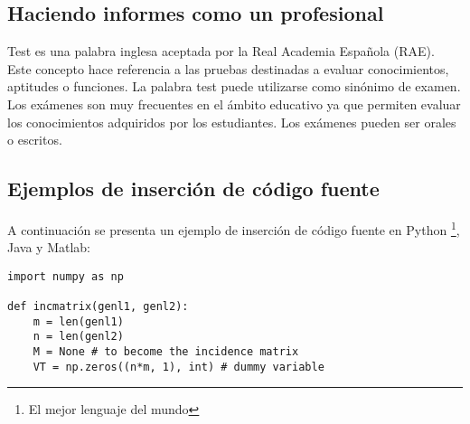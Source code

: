 	\subsection{Haciendo informes como un profesional}
		
		
		Test es una palabra inglesa aceptada por la Real Academia Española (RAE). Este concepto hace referencia a las pruebas destinadas a evaluar conocimientos, aptitudes o funciones. La palabra test puede utilizarse como sinónimo de examen. Los exámenes son muy frecuentes en el ámbito educativo ya que permiten evaluar los conocimientos adquiridos por los estudiantes. Los exámenes pueden ser orales o escritos.
		
		\newp \lipsum[115]
		
		\newp \lipsum[2]
		
		
		\lipsum[115]

		\newp \lipsum[4]
		
	\subsection{Ejemplos de inserción de código fuente}
		
		A continuación se presenta un ejemplo de inserción de código fuente en Python \footnote{El mejor lenguaje del mundo}, Java y Matlab:
		
\lstset{style=Python}
\begin{lstlisting}[caption=Ejemplo en Python]
import numpy as np

def incmatrix(genl1, genl2):
	m = len(genl1)
	n = len(genl2)
	M = None # to become the incidence matrix
	VT = np.zeros((n*m, 1), int) # dummy variable
\end{lstlisting}

